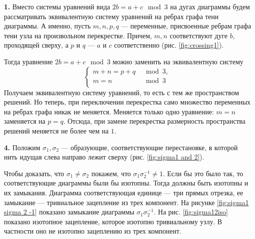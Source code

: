 \documentclass[a4paper]{article}
\begin{document}
\textbf{1.} Вместо системы уравнений вида \( 2b = a + c \mod 3 \) на
дугах диаграммы будем рассматривать эквивалентную систему уравнений
на ребрах графа тени диаграммы. А именно, пусть \( m,n,p,q \) ---
переменные, присвоенные ребрам графа тени узла на произвольном
перекрестке. Причем, \( m,n \) соответствуют дуге \( b \), проходящей
сверху, а \( p \) и \( q \) --- \( a \) и \( c \) соответственно
(рис. \ref{fig:crossing1}).


Тогда уравнение \(  2b = a + c \mod 3 \) можно заменить на эквивалентную систему
\[
  \begin{cases}
    m + n = p + q &\mod 3,\\
    m = n &\mod 3\\
  \end{cases}
\]
Получаем эквивалентную систему уравнений, то есть с тем же
пространством решений. Но теперь, при переключении перекрестка само
множество переменных на ребрах графа никак не меняется. Меняется
только одно уравнение: \( m = n \) заменяется на \( p=q \). Отсюда,
при замене перекрестка размерность пространства решений меняется не
более чем на \( 1 \).

\textbf{4.} Положим \( \sigma _1, \sigma _2 \) --- образующие,
соответствующие перестановке, в которой нить идущая слева направо
лежит сверху (рис. \ref{fig:sigma1 and 2}).


Чтобы доказать, что \(\sigma _1 \neq \sigma _2 \)
покажем, что \( \sigma _1 \sigma _2^{-1} \neq 1 \). Если бы это было
так, то соответствующие диаграммы были бы изотопны. Тогда должны быть
изотопны и их замыкания. Диаграмма соответствующая единице --- три
прямых отрезка, ее замыкание --- тривиальное зацепление из трех
компонент. На рисунке \ref{fig:sigma1 sigma 2 -1} показано замыкание
диаграммы \( \sigma _1
\sigma _2^{-1} \). На рис. \ref{fig:sigma12iso} показано изотопное
зацепление, которое
изотопно тривиальному узлу. В частности оно не изотопно зацеплению из
трех компонент.


\end{document}
